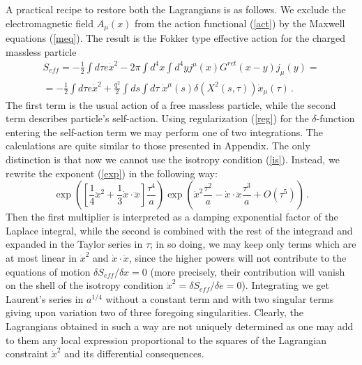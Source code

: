 \documentclass[a4paper,12pt]{article}
\begin{document}
A practical recipe to restore both the Lagrangians is as follows.
We exclude the electromagnetic field $A_\mu(x)$ from the action
functional (\ref{act}) by the Maxwell equations (\ref{meq}). The
result is the Fokker type \cite{Fokker} effective action for the
charged massless particle
\begin{equation}\label{effact}
\begin{array}{r}
\displaystyle S_{eff}=-\frac12\int d\tau e\dot x^2-2\pi\int
d^4x\int
d^4yj^\mu (x)G^{ret}(x-y)j_\mu (y)=  \\[5mm]
\displaystyle =-\frac12\int d\tau e\dot x^2+\frac{q^2}{2}\int
ds\int d\tau \;\dot x^\mu (s)\delta(X^2(s,\tau))\dot x_\mu (\tau
)\,.
\end{array}
\end{equation}
The first term is the usual action of a free massless particle,
while the second term describes particle's self-action. Using
regularization (\ref{reg}) for the $\delta$-function entering the
self-action term we may perform one of two integrations. The
calculations are quite similar to those presented in  Appendix.
The only distinction is that now we cannot use the isotropy
condition (\ref{is}). Instead, we rewrite the exponent
(\ref{exp}) in the following way:
\begin{equation}\label{}
\exp\left(\left[\frac 14\ddot{x}^2+\frac13 \dot x\cdot\dddot x
\right]\frac{\tau ^4}a\right)\exp\left(
\dot{x}^2\frac{\tau^2}a-\dot x\cdot\ddot x \frac {\tau
^3}a+O(\tau^5)\right)\,.
\end{equation}
Then the first multiplier is interpreted as a damping exponential
factor of the Laplace integral, while the second is combined with
the rest of the integrand and expanded in the Taylor series in
$\tau$; in so doing, we may keep only terms which are at most
linear in $\dot x^2$ and $\dot x\cdot \ddot x$, since the higher
powers will not contribute to the equations of motion $\delta
S_{eff}/\delta x=0$ (more precisely, their contribution will
vanish on the shell of the isotropy condition $\dot x^2=\delta
S_{eff}/\delta e=0$). Integrating we get Laurent's series in
$a^{1/4}$ without a constant term and with two singular terms
giving upon variation two of three foregoing singularities.
Clearly, the Lagrangians obtained in such a way are not uniquely
determined as one may add to them any local expression
proportional to the squares of the Lagrangian constraint $\dot
x^2$ and its differential consequences.
\end{document}
